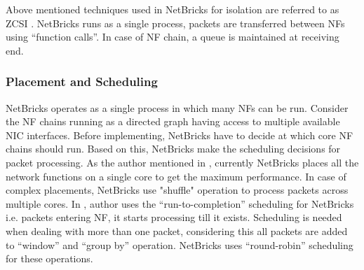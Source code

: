 \documentclass[10pt, a4paper, conference]{IEEEtran}
\begin{document}
Above mentioned techniques used in NetBricks for isolation are referred to as ZCSI \cite{Panda2016}. NetBricks runs as a single process, packets are transferred between NFs using “function calls”. In case of NF chain, a queue is maintained at receiving end.
\subsubsection{Placement and Scheduling}
NetBricks operates as a single process in which many NFs can be run. Consider the NF chains running as a directed graph having access to multiple available NIC interfaces. Before implementing, NetBricks have to decide at which core NF chains should run. Based on this, NetBricks make the scheduling decisions for packet processing. As the author mentioned in \cite{Panda2016}, currently NetBricks places all the network functions on a single core to get the maximum performance. In case of complex placements, NetBricks use "shuffle" operation to process packets across multiple cores. 
In \cite{Panda2016}, author uses the “run-to-completion” scheduling for NetBricks i.e. packets entering NF, it starts processing till it exists. Scheduling is needed when dealing with more than one packet, considering this all packets are added to  “window” and “group by” operation. NetBricks uses “round-robin” scheduling for these operations. 
 
\end{document}

